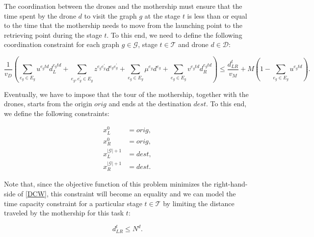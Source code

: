 \noindent
The coordination between the drones and the mothership must ensure that the time spent by the drone $d$ to visit the graph $g$ at the stage $t$ is less than or equal to the time that the mothership needs to move from the launching point to the retrieving point during the stage $t$. To this end, we need to define the following coordination constraint for each graph $g\in \mathcal G$, stage $t\in \mathcal T$ and drone $d\in\mathcal D$:

\begin{equation}\tag{DCW}\label{DCW}
\frac{1}{v_D}\left(\sum_{e_g\in E_g} u^{e_gtd}d_L^{e_gtd} + \sum_{e_g, e^\prime_g\in E_g}z^{e_ge^\prime_g}d^{e_ge^\prime_g} + \sum_{e_g\in E_g} \mu^{e_g}d^{e_g} + \sum_{e_g\in E_g} v^{e_gtd}d_R^{e_gtd}\right) \leq \frac{d_{LR}^t}{v_M} + M(1 - \sum_{e_g\in E_g} u^{e_gtd}).
\end{equation}


\noindent
Eventually, we have to impose that the tour of the mothership, together with the drones, starts from the origin $orig$ and ends at the destination $dest$. To this end, we define the following constraints:

\begin{align*}
x_L^0 & =  orig,  \tag{ORIG$_1$} \label{eq:O1} \\
x_R^0 & =  orig,  \tag{ORIG$_2$} \label{eq:O2} \\
x_L^{|\mathcal{G}|+1} & =  dest,  \tag{DEST$_1$} \label{eq:D1} \\
x_R^{|\mathcal{G}|+1} & =  dest.  \tag{DEST$_2$} \label{eq:D2} 
\end{align*}

\noindent
Note that, since the objective function of this problem minimizes the right-hand-side of \eqref{DCW}, this constraint will become an equality and we can model the time capacity constraint for a particular stage $t\in \mathcal T$ by limiting the distance traveled by the mothership for this task $t$:

\begin{equation}\tag{Capacity}\label{CAP}
    d_{LR}^t \leq N^d.
\end{equation}






